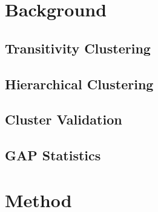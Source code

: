\documentclass[a4paper,10pt]{article}
\begin{document}
\newpage
\section{Background}

\subsection{Transitivity Clustering}

\subsection{Hierarchical Clustering}

\subsection{Cluster Validation}

\subsection{GAP Statistics}

\newpage
\section{Method}
\end{document}
